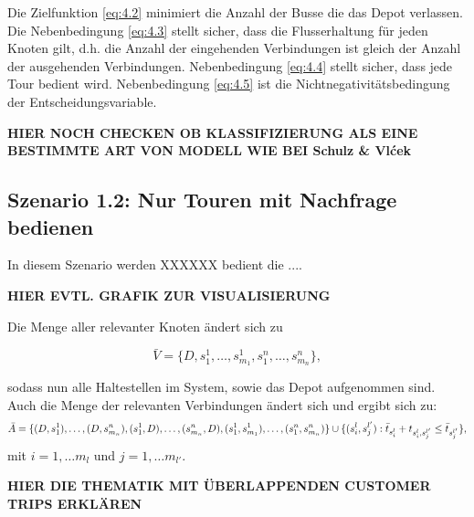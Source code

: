 Die Zielfunktion \ref{eq:4.2} minimiert die Anzahl der Busse die das Depot verlassen. Die Nebenbedingung \ref{eq:4.3} stellt sicher, dass die Flusserhaltung für jeden Knoten gilt, d.h. die Anzahl der eingehenden Verbindungen ist gleich der Anzahl der ausgehenden Verbindungen. Nebenbedingung \ref{eq:4.4} stellt sicher, dass jede Tour bedient wird. Nebenbedingung \ref{eq:4.5} ist die Nichtnegativitätsbedingung der Entscheidungsvariable.

\textbf{HIER NOCH CHECKEN OB KLASSIFIZIERUNG ALS EINE BESTIMMTE ART VON MODELL WIE BEI Schulz \& Vlćek}

\subsection{Szenario 1.2: Nur Touren mit Nachfrage bedienen}
In diesem Szenario werden XXXXXX bedient die ....

\textbf{HIER EVTL. GRAFIK ZUR VISUALISIERUNG}

Die Menge aller relevanter Knoten ändert sich zu

\[
\bar{V} = \{ D, s^1_1, \dots, s^1_{m_1}, s^n_1, \dots, s^n_{m_n} \},
\]

sodass nun alle Haltestellen im System, sowie das Depot aufgenommen sind. Auch die Menge der relevanten Verbindungen ändert sich und ergibt sich zu:
\[
\bar{A}= \{(D, s_1^1), \ldots, (D, s^n_{m_n}), (s_1^1, D), \ldots, (s_{m_n}^n, D), (s_1^1, s_{m_1}^1), \ldots, (s_1^n, s_{m_n}^n)\}   \\   
\cup \{(s_i^l, s_j^{l'}) : \bar{t}_{s_i^l} + t_{s_i^l, s_j^{l'}} \leq \bar{t}_{s_j^{l'}}\},
\]
mit \(i =  {1, \dots m_l}\) und \(j = {1, \dots m_{l'}}\).

\textbf{HIER DIE THEMATIK MIT ÜBERLAPPENDEN CUSTOMER TRIPS ERKLÄREN}


